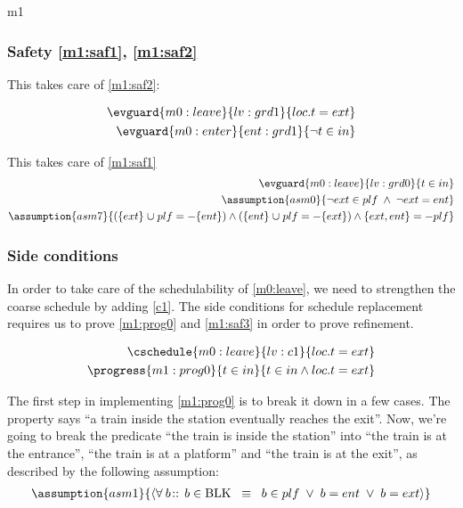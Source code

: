 \documentclass[12pt]{amsart}
\begin{document}
\begin{machine}{m1}
\subsubsection{Safety \ref{m1:saf1}, \ref{m1:saf2}}

This takes care of \eqref{m1:saf2}:

\begin{align*}
\evguard{m0:leave}{lv:grd1}
	{ loc.t = ext }
\\ \evguard{m0:enter}{ent:grd1}
	{ \neg t \in in }
\end{align*}

This takes care of \eqref{m1:saf1}
\newcommand{\compl}{-}
\begin{align*}
\evguard{m0:leave}{lv:grd0}
	{ t \in in }
\\ \assumption{asm0}
	{ \neg ext \in plf \1\land \neg ext = ent } \\
% 
\assumption{asm7}{ (\{ ext \} \bunion plf = \compl \{ent\}) \land (\{ ent \} \bunion plf = \compl \{ext\}) \land \{ ext, ent \} = \compl plf } 
\end{align*}
\subsubsection{Side conditions}
In order to take care of the schedulability of \ref{m0:leave}, we need to strengthen the coarse schedule by adding \ref{c1}. The side conditions for schedule replacement requires us to prove \ref{m1:prog0} and \ref{m1:saf3} in order to prove refinement.

\begin{align*}
\cschedule{m0:leave}{lv:c1}
	{ loc.t = ext }
\\ \progress{m1:prog0}
	{ t \in in }{ t \in in \land loc.t = ext }
\end{align*}

The first step in implementing \eqref{m1:prog0} is to break it down in a few cases. The property says ``a train inside the station eventually reaches the exit''. Now, we're going to break the predicate ``the train is inside the station'' into ``the train is at the entrance'', ``the train is at a platform'' and ``the train is at the exit'', as described by the following assumption:
\begin{align*}
\assumption{asm1}
{	\qforall{b}{}{ b \in \Blk \2\equiv b \in plf \1\lor b = ent \1\lor b = ext }	}
\end{align*}


\end{machine}
\end{document}
